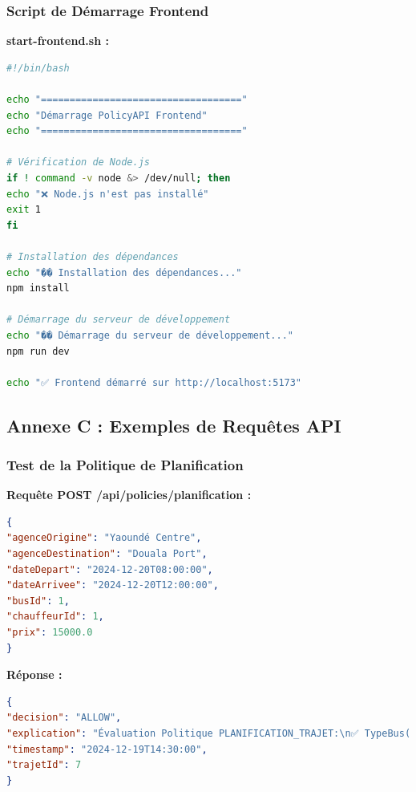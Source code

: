 \documentclass[12pt,a4paper]{article}
\begin{document}
\subsubsection{Script de Démarrage Frontend}

\begin{codebox}
\textbf{start-frontend.sh :}
\begin{lstlisting}[language=bash]
#!/bin/bash

echo "==================================="
echo "Démarrage PolicyAPI Frontend"
echo "==================================="

# Vérification de Node.js
if ! command -v node &> /dev/null; then
echo "❌ Node.js n'est pas installé"
exit 1
fi

# Installation des dépendances
echo "�� Installation des dépendances..."
npm install

# Démarrage du serveur de développement
echo "�� Démarrage du serveur de développement..."
npm run dev

echo "✅ Frontend démarré sur http://localhost:5173"
\end{lstlisting}
\end{codebox}

\subsection{Annexe C : Exemples de Requêtes API}

\subsubsection{Test de la Politique de Planification}

\begin{codebox}
\textbf{Requête POST /api/policies/planification :}
\begin{lstlisting}[language=JSON]
{
"agenceOrigine": "Yaoundé Centre",
"agenceDestination": "Douala Port",
"dateDepart": "2024-12-20T08:00:00",
"dateArrivee": "2024-12-20T12:00:00",
"busId": 1,
"chauffeurId": 1,
"prix": 15000.0
}
\end{lstlisting}

\textbf{Réponse :}
\begin{lstlisting}[language=JSON]
{
"decision": "ALLOW",
"explication": "Évaluation Politique PLANIFICATION_TRAJET:\n✅ TypeBus(b) = VIP\n✅ BusDisponible(a0,b,t,h) = OUI\n✅ ChauffeurDisponible(a0,c) = OUI\n✅ EspaceDisponible(ad,h) = OUI (2 trajets)\n✅ CapaciteBus(b,d) < MAX (0/20)\n✅ Trajet créé avec succès (ID: 7)",
"timestamp": "2024-12-19T14:30:00",
"trajetId": 7
}
\end{lstlisting}
\end{codebox}
\end{document}
